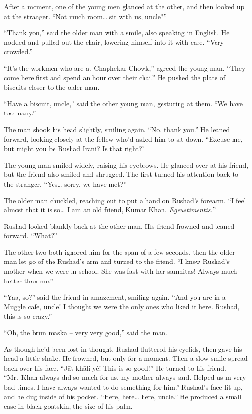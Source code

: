 After a moment, one of the young men glanced at the other, and then
looked up at the stranger. ``Not much room\ldots{} sit with us, uncle?''

``Thank you,'' said the older man with a smile, also speaking in
English. He nodded and pulled out the chair, lowering himself into it
with care. ``Very crowded.''

``It's the workmen who are at Chaphekar Chowk,'' agreed the young man.
``They come here first and spend an hour over their chai.'' He pushed
the plate of biscuits closer to the older man.

``Have a biscuit, uncle,'' said the other young man, gesturing at them.
``We have too many.''

The man shook his head slightly, smiling again. ``No, thank you.'' He
leaned forward, looking closely at the fellow who'd asked him to sit
down. ``Excuse me, but might you be Rushad Irani? Is that right?''

The young man smiled widely, raising his eyebrows. He glanced over at
his friend, but the friend also smiled and shrugged. The first turned
his attention back to the stranger. ``Yes\ldots{} sorry, we have met?''

The older man chuckled, reaching out to put a hand on Rushad's forearm.
``I feel almost that it is so\ldots{} I am an old friend, Kumar Khan.
\emph{Egeustimentis.}''

Rushad looked blankly back at the other man. His friend frowned and
leaned forward. ``What?''

The other two both ignored him for the span of a few seconds, then the
older man let go of the Rushad's arm and turned to the friend. ``I knew
Rushad's mother when we were in school. She was fast with her samhitas!
Always much better than me.''

``Yaa, so?'' said the friend in amazement, smiling again. ``And you are
in a Muggle cafe, uncle! I thought we were the only ones who liked it
here. Rushad, this is so crazy.''

``Oh, the brun maska -- very very good,'' said the man.

As though he'd been lost in thought, Rushad fluttered his eyelids, then
gave his head a little shake. He frowned, but only for a moment. Then a
slow smile spread back over his face. ``Jāt khāli-yé! This is so good!''
He turned to his friend. ``Mr.~Khan always did so much for us, my mother
always said. Helped us in very bad times. I have always wanted to do
something for him.'' Rushad's face lit up, and he dug inside of his
pocket. ``Here, here\ldots{} here, uncle.'' He produced a small case in
black goatskin, the size of his palm.

